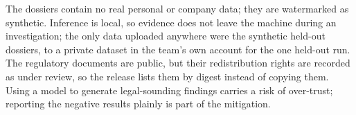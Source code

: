 The dossiers contain no real personal or company data; they are watermarked as synthetic. Inference
is local, so evidence does not leave the machine during an investigation; the only data uploaded
anywhere were the synthetic held-out dossiers, to a private dataset in the team's own account for the
one held-out run. The regulatory documents are public, but their redistribution rights are recorded
as under review, so the release lists them by digest instead of copying them. Using a model to
generate legal-sounding findings carries a risk of over-trust; reporting the negative results
plainly is part of the mitigation.

